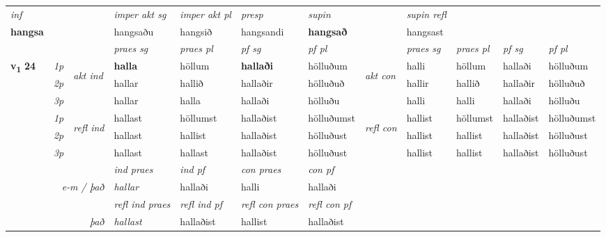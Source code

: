 \begin{longtable}[l]{X>{\footnotesize\itshape}llXXXXlXXXX}
   {\textit{inf}} & &  & \textit{imper akt sg} & \textit{imper akt pl}   & \textit{presp} & \textit{supin} && \textit{supin refl}  \\*
  {\textbf{hangsa}} & && hangsaðu  & hangsið   & hangsandi &  \textbf{hangsað} && hangsast  \\*

\midrule

 & &   & \textit{praes sg}  & \textit{praes pl}    & \textit{ pf sg} & \textit{pf pl} & & \textit{praes sg}  & \textit{praes pl}    & \textit{pf sg} & \textit{pf pl }  \\ \cmidrule{4-7} \cmidrule{9-12}
 \multirow{2}{*}{{{\textbf{v{\textsubscript{1}}} \Large{\textbf{24}}}}}  & 1p & \multirow{3}{*}{\begin{turn}{90}\textit{akt ind}\end{turn}} & \textbf{halla} & höllum & \textbf{hallaði} & hölluðum & \multirow{3}{*}{\begin{turn}{90}\textit{akt con}\end{turn}} &halli & höllum & hallaði & hölluðum\\*
 & 2p &  &  hallar  & hallið & hallaðir & hölluðuð & & hallir & hallið & hallaðir & hölluðuð \\*
 & 3p &  & hallar & halla & hallaði & hölluðu & & halli & halli& hallaði & hölluðu \\*
\cmidrule{4-7} \cmidrule{9-12}
 & 1p & \multirow{3}{*}{\begin{turn}{90}\textit{refl ind}\end{turn}}  & hallast & höllumst & hallaðist & hölluðumst & \multirow{3}{*}{\begin{turn}{90}\textit{refl con}\end{turn}}  &hallist & höllumst & hallaðist & hölluðumst \\*
 & 2p &  & hallast & hallist & hallaðist & hölluðust & &hallist & hallist & hallaðist & hölluðust \\*
 & 3p  & & hallast & hallast & hallaðist & hölluðust & & hallist & hallist& hallaðist & hölluðust \\*
\cmidrule{4-7} \cmidrule{9-12}

   && &  \textit{ind praes} & \textit{ind pf} & \textit{con praes} & \textit{con pf} \\*
\multicolumn{3}{r}{\textit{e-m / það}} & hallar & hallaði & halli & hallaði \\*

\cmidrule{4-7}
 & && \textit{refl ind praes} & \textit{refl ind pf} & \textit{refl con praes} & \textit{refl con pf} \\*
\multicolumn{3}{r}{\textit{það}}& hallast & hallaðist & hallist & hallaðist \\*


\end{longtable}

